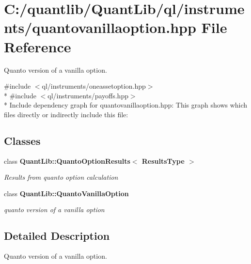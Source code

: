 \section{C\+:/quantlib/\+Quant\+Lib/ql/instruments/quantovanillaoption.hpp File Reference}
\label{quantovanillaoption_8hpp}


Quanto version of a vanilla option.  


{\ttfamily \#include $<$ql/instruments/oneassetoption.\+hpp$>$}\\*
{\ttfamily \#include $<$ql/instruments/payoffs.\+hpp$>$}\\*
Include dependency graph for quantovanillaoption.\+hpp\+:
This graph shows which files directly or indirectly include this file\+:
\subsection*{Classes}
\begin{DoxyCompactItemize}
\item 
class {\bf Quant\+Lib\+::\+Quanto\+Option\+Results$<$ Results\+Type $>$}
\begin{DoxyCompactList}\small\item\em Results from quanto option calculation \end{DoxyCompactList}\item 
class {\bf Quant\+Lib\+::\+Quanto\+Vanilla\+Option}
\begin{DoxyCompactList}\small\item\em quanto version of a vanilla option \end{DoxyCompactList}\end{DoxyCompactItemize}


\subsection{Detailed Description}
Quanto version of a vanilla option. 

